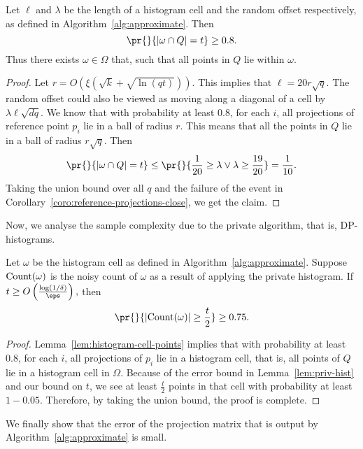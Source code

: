 \begin{lemma}\label{lem:histogram-cell-points}
    Let $\ell$ and $\lambda$ be the length of a histogram
    cell and the random offset respectively, as defined in
    Algorithm~\ref{alg:approximate}. Then
    $$\pr{}{|\omega \cap Q| = t} \geq 0.8.$$
    Thus there exists $\omega \in \Omega$ that,
    such that all points in $Q$ lie within $\omega$.
\end{lemma}
\begin{proof}
    Let $r = O(\xi(\sqrt{k}+\sqrt{\ln(qt)}))$. This implies that $\ell = 20r\sqrt{q}$.
    The random offset could also be viewed as moving along a
    diagonal of a cell by $\lambda\ell\sqrt{dq}$. We know that
    with probability at least $0.8$, for each $i$, all projections
    of reference point $p_i$ lie in a ball of radius $r$.
    This means that all the points in $Q$ lie in a ball of
    radius $r\sqrt{q}$. Then
    $$\pr{}{|\omega \cap Q| = t} \leq \pr{}{\frac{1}{20} \geq
        \lambda \vee \lambda \geq \frac{19}{20}} = \frac{1}{10}.$$
    Taking the union bound over all $q$ and the failure
    of the event in Corollary~\ref{coro:reference-projections-close},
    we get the claim.
\end{proof}

Now, we analyse the sample complexity due
to the private algorithm, that is,
DP-histograms.

\begin{lemma}\label{lem:dp-histogram-cost}
    Let $\omega$ be the histogram cell as defined in
    Algorithm~\ref{alg:approximate}. Suppose $\mathrm{Count}(\omega)$
    is the noisy count of $\omega$ as a result of applying
    the private histogram. If
    $t \geq O\left(\frac{\log(1/\delta)}{\eps}\right),$
    then
    $$\pr{}{\abs{\pcount(\omega)} \geq \frac{t}{2}} \geq 0.75.$$
\end{lemma}
\begin{proof}
    Lemma~\ref{lem:histogram-cell-points} implies that
    with probability at least $0.8$, for each $i$, all
    projections of $p_i$ lie in a histogram cell, that is,
    all points of $Q$ lie in a histogram cell in $\Omega$.
    Because of the error bound in Lemma~\ref{lem:priv-hist}
    and our bound on $t$, we see at least $\tfrac{t}{2}$
    points in that cell with probability at least $1-0.05$.
    Therefore, by taking the union bound, the proof is complete.
\end{proof}

We finally show that the error of the projection matrix
that is output by Algorithm~\ref{alg:approximate} is small.

